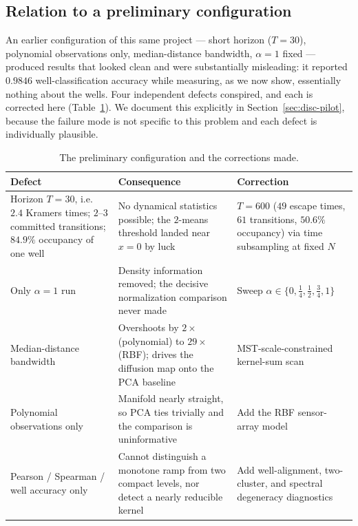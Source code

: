 \documentclass[11pt]{article}
\begin{document}
\subsection{Relation to a preliminary configuration}
\label{sec:pilot-intro}

An earlier configuration of this same project --- short horizon ($T=30$),
polynomial observations only, median-distance bandwidth, $\alpha = 1$ fixed ---
produced results that looked clean and were substantially misleading: it reported
$0.9846$ well-classification accuracy while measuring, as we now show, essentially
nothing about the wells. Four independent defects conspired, and each is
corrected here (Table~\ref{tab:corrections}). We document this explicitly in
Section~\ref{sec:disc-pilot}, because the failure mode is not specific to this
problem and each defect is individually plausible.

\begin{table}[t]
\centering
\caption{The preliminary configuration and the corrections made.}
\label{tab:corrections}
\small
\begin{tabular}{@{}p{}p{}p{}@{}}
\toprule
Defect & Consequence & Correction \\
\midrule
Horizon $T=30$, i.e.\ $2.4$ Kramers times; $2$--$3$ committed transitions;
$84.9\%$ occupancy of one well
& No dynamical statistics possible; the $2$-means threshold landed near $x=0$ by
luck
& $T = 600$ ($49$ escape times, $61$ transitions, $50.6\%$ occupancy) via time
subsampling at fixed $N$ \\[4pt]
Only $\alpha = 1$ run
& Density information removed; the decisive normalization comparison never made
& Sweep $\alpha \in \{0,\tfrac14,\tfrac12,\tfrac34,1\}$ \\[4pt]
Median-distance bandwidth
& Overshoots by $2\times$ (polynomial) to $29\times$ (RBF); drives the diffusion
map onto the PCA baseline
& MST-scale-constrained kernel-sum scan \\[4pt]
Polynomial observations only
& Manifold nearly straight, so PCA ties trivially and the comparison is
uninformative
& Add the RBF sensor-array model \\[4pt]
Pearson / Spearman / well accuracy only
& Cannot distinguish a monotone ramp from two compact levels, nor detect a
nearly reducible kernel
& Add well-alignment, two-cluster, and spectral degeneracy diagnostics \\
\bottomrule
\end{tabular}
\end{table}
\end{document}

